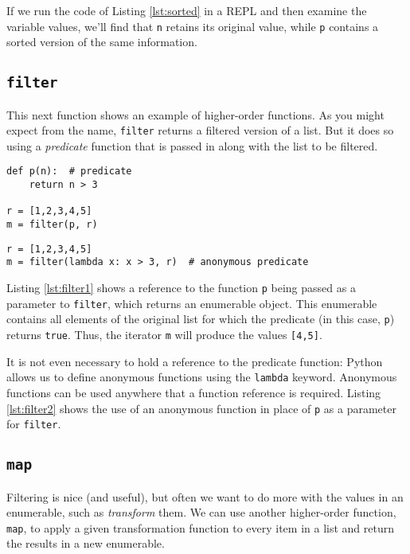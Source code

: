 \documentclass{article}\usepackage{beamerarticle}
\begin{document}
\noindent If we run the code of Listing \ref{lst:sorted} in a REPL and then examine the variable values, we'll find that \texttt{n} retains its original value, while \texttt{p} contains a sorted version of the same information.

\subsection{\tt filter}
This next function shows an example of higher-order functions. As you might expect from the name, \texttt{filter} returns a filtered version of a list. But it does so using a \textit{predicate} function that is passed in along with the list to be filtered.

\begin{frame}[fragile]
\begin{lstlisting}[style=python,caption={Filtering a List},label={lst:filter1}]
def p(n):  # predicate
    return n > 3

r = [1,2,3,4,5]
m = filter(p, r)
\end{lstlisting}

\begin{lstlisting}[style=python,caption={Anonymous Functions},label={lst:filter2}]
r = [1,2,3,4,5]
m = filter(lambda x: x > 3, r)  # anonymous predicate
\end{lstlisting}
\end{frame}

Listing \ref{lst:filter1} shows a reference to the function \texttt{p} being passed as a parameter to \texttt{filter}, which returns an enumerable object. This enumerable contains all elements of the original list for which the predicate (in this case, \texttt{p}) returns \texttt{true}. Thus, the iterator \texttt{m} will produce the values \texttt{[4,5]}.

It is not even necessary to hold a reference to the predicate function: Python allows us to define anonymous functions using the \texttt{lambda} keyword. Anonymous functions can be used anywhere that a function reference is required. Listing \ref{lst:filter2} shows the use of an anonymous function in place of \texttt{p} as a parameter for \texttt{filter}.

\subsection{\tt map}
Filtering is nice (and useful), but often we want to do more with the values in an enumerable, such as \textit{transform} them. We can use another higher-order function, \texttt{map}, to apply a given transformation function to every item in a list and return the results in a new enumerable.
\end{document}
